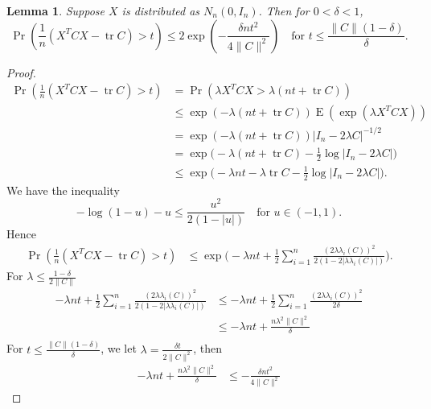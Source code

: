 \documentclass[11pt]{article}
\DeclareMathOperator{\mytr}{tr}
\DeclareMathOperator{\myE}{E}
\theoremstyle{plain}
\newtheorem{lemma}{\quad\quad Lemma}
\theoremstyle{definition}
\theoremstyle{remark}
\begin{document}
\begin{lemma}
    Suppose $X$ is distributed as $N_n(0,I_n)$. Then for $0<\delta <1$,
    $$
        \Pr(\frac{1}{n}(X^T C X -\mytr C)>t)
    \leq 2\exp(-\frac{\delta n t^2}{4\|C\|^2})\quad \text{for $t\leq \frac{\|C\|(1-\delta)}{\delta}$}.
    $$
\end{lemma}
\begin{proof}
$$
    \begin{aligned}
        \Pr(\frac{1}{n}(X^T C X -\mytr C)>t) &=
    \Pr(\lambda X^T C X >\lambda(nt+ \mytr C)) \\
        &\leq
    \exp(-\lambda(nt+\mytr C))
        \myE (\exp(\lambda X^T C X))\\
        &=
    \exp(-\lambda(nt+\mytr C))
        |I_n-2\lambda C|^{-1/2}\\
        &=
    \exp\big(-\lambda(nt+\mytr C)
        -\frac{1}{2}\log|I_n-2\lambda C|\big)\\
        &\leq
    \exp\big(-\lambda nt-\lambda\mytr C
        -\frac{1}{2}\log|I_n-2\lambda C|\big).
    \end{aligned}
    $$
We have the inequality
$$
    -\log(1-u)-u\leq \frac{u^2}{2(1-|u|)}\quad \text{for $u\in(-1,1)$}.
$$
Hence
$$
    \begin{aligned}
        \Pr(\frac{1}{n}(X^T C X -\mytr C)>t) &\leq
        \exp\big(-\lambda nt +\frac{1}{2}\sum_{i=1}^n \frac{(2\lambda \lambda_i(C))^2}{2(1-2|\lambda \lambda_i(C)|)}\big).
    \end{aligned}
    $$
    For $\lambda\leq \frac{1-\delta}{2\|C\|}$
    $$
    \begin{aligned}
    -\lambda nt +\frac{1}{2}\sum_{i=1}^n \frac{(2\lambda \lambda_i(C))^2}{2(1-2|\lambda \lambda_i(C)|)}
        &\leq
    -\lambda nt +\frac{1}{2}\sum_{i=1}^n \frac{(2\lambda \lambda_i(C))^2}{2\delta}\\
        &\leq
        -\lambda nt + \frac{n\lambda^2 \|C\|^2}{\delta}\\
    \end{aligned}
    $$
    For $t\leq \frac{\|C\|(1-\delta)}{\delta}$, we let $\lambda=\frac{\delta t}{2\|C\|^2}$, then
    $$
    \begin{aligned}
        -\lambda nt + \frac{n\lambda^2 \|C\|^2}{\delta}
        &\leq
        -\frac{\delta n t^2}{4\|C\|^2}
    \end{aligned}
    $$
\end{proof}
\end{document}
